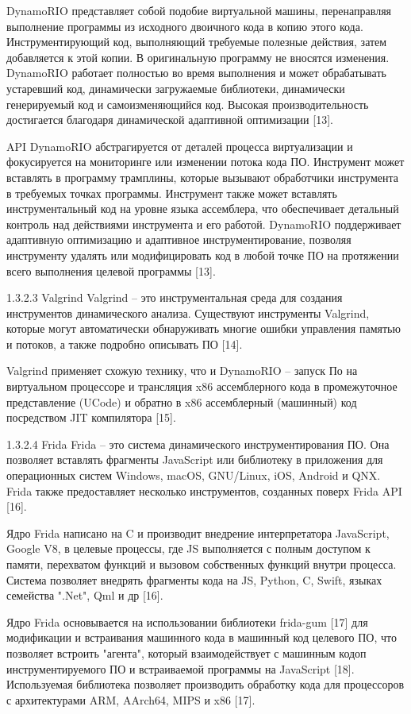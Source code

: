 DynamoRIO представляет собой подобие виртуальной машины, перенаправляя выполнение программы из исходного двоичного кода в копию этого кода. Инструментирующий код, выполняющий требуемые полезные действия, затем добавляется к этой копии. В оригинальную программу не вносятся изменения. DynamoRIO работает полностью во время выполнения и может обрабатывать устаревший код, динамически загружаемые библиотеки, динамически генерируемый код и самоизменяющийся код. Высокая производительность достигается благодаря динамической адаптивной оптимизации [13].

API DynamoRIO абстрагируется от деталей процесса виртуализации и фокусируется на мониторинге или изменении потока кода ПО. Инструмент может вставлять в программу трамплины, которые вызывают обработчики инструмента в требуемых точках программы. Инструмент также может вставлять инструментальный код на уровне языка ассемблера, что обеспечивает детальный контроль над действиями инструмента и его работой. DynamoRIO поддерживает адаптивную оптимизацию и адаптивное инструментирование, позволяя инструменту удалять или модифицировать код в любой точке ПО на протяжении всего выполнения целевой программы [13].

1.3.2.3 Valgrind
Valgrind -- это инструментальная среда для создания инструментов динамического анализа. Существуют инструменты Valgrind, которые могут автоматически обнаруживать многие ошибки управления памятью и потоков, а также подробно описывать ПО [14].

Valgrind применяет схожую технику, что и DynamoRIO -- запуск По на виртуальном процессоре и трансляция x86 ассемблерного кода в промежуточное представление (UCode) и обратно в x86 ассемблерный (машинный) код посредством JIT компилятора [15].

1.3.2.4 Frida
Frida -- это система динамического инструментирования ПО. Она позволяет вставлять фрагменты JavaScript или библиотеку в приложения для операционных систем Windows, macOS, GNU/Linux, iOS, Android и QNX. Frida также предоставляет несколько инструментов, созданных поверх Frida API [16].

Ядро Frida написано на C и производит внедрение интерпретатора JavaScript, Google V8, в целевые процессы, где JS выполняется с полным доступом к памяти, перехватом функций и вызовом собственных функций внутри процесса. Система позволяет внедрять фрагменты кода на JS, Python, C, Swift, языках семейства ".Net", Qml и др [16].

Ядро Frida основывается на использовании библиотеки frida-gum [17] для модификации и встраивания машинного кода в машинный код целевого ПО, что позволяет встроить "агента", который взаимодействует с машинным кодоп инструментируемого ПО и встраиваемой программы на JavaScript [18]. Используемая библиотека позволяет производить обработку кода для процессоров с архитектурами ARM, AArch64, MIPS и x86 [17].

